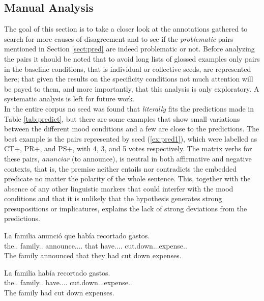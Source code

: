\subsection{Manual Analysis}
\label{subsect:man}

The goal of this section is to take a closer look at the annotations gathered to search for more causes of disagreement and to see if the \textit{problematic} pairs mentioned in Section \ref{sect:pred} are indeed problematic or not. Before analyzing the pairs it should be noted that to avoid long lists of glossed examples only pairs in the baseline conditions, that is individual or collective seeds, are represented here; that given the results on the specificity conditions not much attention will be payed to them, and more importantly, that this analysis is only exploratory. A systematic analysis is left for future work.\\ 

In the entire corpus no seed was found that \textit{literally} fits the predictions made in Table \ref{tab:predict}, but there are some examples that show small variations between the different mood conditions and a few are close to the predictions. The best example is the pairs represented by seed (\ref{ex:pred1}), which were labelled as CT+, PR+, and PS+, with 4, 3, and 5 votes respectively. The matrix verbs for these pairs, \textit{anunciar} (to announce), is neutral in both affirmative and negative contexts, that is, the premise neither entails nor contradicts the embedded predicate no matter the polarity of the whole sentence. This, together with the absence of any other linguistic markers that could interfer with the mood conditions and that it is unlikely that the hypothesis generates strong presupositions or implicatures, explains the lack of strong deviations from the predictions.\\ 
\begin{exe}
  \ex\label{ex:pred1}
    \begin{xlist}
      \item{\gll La familia anunció que había recortado gastos.\\ the.\F.\Sg{} family.\F.\Sg{} announce.\Pst.\Pfv.\Ind.\Tsg{} that have.\Pst.\Ipfv.\Ind.\Tsg{} cut.down.\Ptcp.\M.\Sg{}expense.\M.\Pl{} \\\glt The family announced that they had cut down expenses.}
      \item{\gll La familia había recortado gastos.\\ the.\F.\Sg{} family.\F.\Sg{} have.\Pst.\Ipfv.\Ind.\Tsg{} cut.down.\Ptcp.\M.\Sg{}expense.\M.\Pl{} \\\glt The family had cut down expenses.} \label{ex:hyppred1}
    \end{xlist}
\end{exe}


